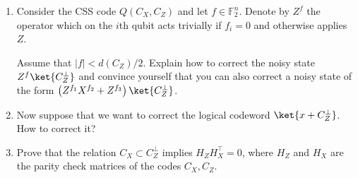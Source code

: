 \documentclass[12pt,a4paper]{article}
\begin{document}
\begin{enumerate}

  \item Consider the CSS code $Q(C_{X}, C_{Z})$ and let $f \in \mathbb{F}_{2}^{n}$. Denote by $Z^{f}$ the operator which on the $i$th qubit acts trivially if $f_{i} = 0$ and otherwise applies $Z$. 

    Assume that $|f| < d(C_{Z})/2$. Explain how to correct the noisy state $Z^{f}\ket{C_{Z}^\perp}$ and convince yourself that you can also correct a noisy state of the form $\left( Z^{f_{1}}X^{f_{2}} + Z^{f_{3}} \right) \ket{C_{Z}^\perp}$.


  \item Now suppose that we want to correct the logical codeword $\ket{x + C_{Z}^\perp}$. How to correct it?   


  \item  Prove that the relation $C_{X} \subset C_{Z}^{\perp}$ implies $H_{Z}H_{X}^\top = 0$, where $H_{Z}$ and $H_{X}$ are the parity check matrices of the codes $C_{X}, C_{Z}$.


\end{enumerate}
\end{document}
